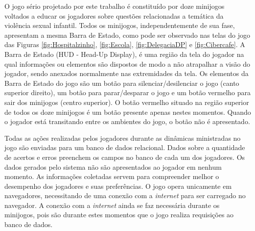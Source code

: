 O jogo sério projetado por este trabalho é constituído por doze minijogos voltados a educar os jogadores sobre questões relacionadas a temática da violência sexual infantil. Todos os minijogos, independentemente de sua fase, apresentam a mesma Barra de Estado, como pode ser observado nas telas do jogo das Figuras \ref{fig:Hospitalzinho}, \ref{fig:Escola}, \ref{fig:DelegaciaDP} e \ref{fig:Cibercafe}. A Barra de Estado (HUD - Head-Up Display), é uma região da tela do jogador na qual informações ou elementos são dispostos de modo a não atrapalhar a visão do jogador, sendo anexados normalmente nas extremidades da tela. Os elementos da Barra de Estado do jogo são um botão para silenciar/desilenciar o jogo (canto superior direito), um botão para parar/desparar o jogo e um botão vermelho para sair dos minijogos (centro superior). O botão vermelho situado na região superior de todos os doze minijogos é um botão presente apenas nestes momentos. Quando o jogador está transitando entre os ambientes do jogo, o botão não é apresentado. 


Todas as ações realizadas pelos jogadores durante as dinâmicas ministradas no jogo são enviadas para um banco de dados relacional. Dados sobre a quantidade de acertos e erros preenchem os campos no banco de cada um dos jogadores. Os dados gerados pelo sistema não são apresentados ao jogador em nenhum momento. As informações coletadas servem para compreender melhor o desempenho dos jogadores e suas preferências. O jogo opera unicamente em navegadores, necessitando de uma conexão com a \textit{internet} para ser carregado no navegador. A conexão com a \textit{internet} ainda se faz necessária durante os minijogos, pois são durante estes momentos que o jogo realiza requisições ao banco de dados. 


